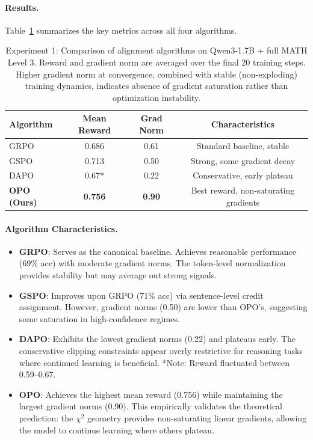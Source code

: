 \documentclass[11pt]{article}
\theoremstyle{definition}
\theoremstyle{remark}
\begin{document}
\paragraph{Results.} Table~\ref{tab:results} summarizes the key metrics across all four algorithms.

\begin{table}[htbp]
\centering
\caption{Experiment 1: Comparison of alignment algorithms on Qwen3-1.7B + full MATH Level 3. Reward and gradient norm are averaged over the final 20 training steps. Higher gradient norm at convergence, combined with stable (non-exploding) training dynamics, indicates absence of gradient saturation rather than optimization instability.}
\label{tab:results}
\begin{tabular}{lccc}
\toprule
\textbf{Algorithm} & \textbf{Mean Reward} & \textbf{Grad Norm} & \textbf{Characteristics} \\
\midrule
GRPO & 0.686 & 0.61 & Standard baseline, stable \\
GSPO & 0.713 & 0.50 & Strong, some gradient decay \\
DAPO & 0.67* & 0.22 & Conservative, early plateau \\
\textbf{OPO (Ours)} & \textbf{0.756} & \textbf{0.90} & Best reward, non-saturating gradients \\
\bottomrule
\end{tabular}
\end{table}

\paragraph{Algorithm Characteristics.}
\begin{itemize}
    \item \textbf{GRPO}: Serves as the canonical baseline. Achieves reasonable performance (69\% acc) with moderate gradient norms. The token-level normalization provides stability but may average out strong signals.
    \item \textbf{GSPO}: Improves upon GRPO (71\% acc) via sentence-level credit assignment. However, gradient norms (0.50) are lower than OPO's, suggesting some saturation in high-confidence regimes.
    \item \textbf{DAPO}: Exhibits the lowest gradient norms (0.22) and plateaus early. The conservative clipping constraints appear overly restrictive for reasoning tasks where continued learning is beneficial. *Note: Reward fluctuated between 0.59--0.67.
    \item \textbf{OPO}: Achieves the highest mean reward (0.756) while maintaining the largest gradient norms (0.90). This empirically validates the theoretical prediction: the $\chi^2$ geometry provides non-saturating linear gradients, allowing the model to continue learning where others plateau.
\end{itemize}
\end{document}
